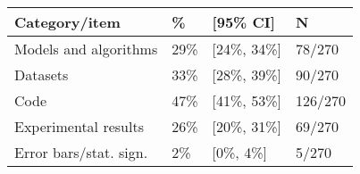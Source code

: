 \begin{tabular}{llll}
\hline
Category/item & \% & [95\% CI]  & N \\
\hline
Models and algorithms & 29\% & [24\%, 34\%] & 78/270\\
Datasets & 33\% & [28\%, 39\%] & 90/270\\
Code & 47\% & [41\%, 53\%] & 126/270\\
Experimental results & 26\% & [20\%, 31\%] & 69/270\\
Error bars/stat. sign.& 2\% & [0\%, 4\%] & 5/270\\
\hline
\end{tabular}
